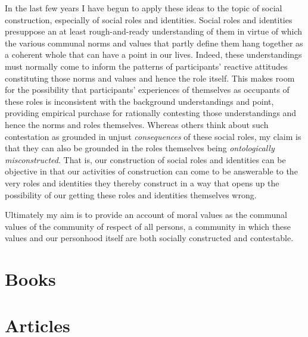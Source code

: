 \documentclass[%
  11pt,%
]{article}
\begin{document}
In the last few years I have begun to apply these ideas to the topic of social construction, especially of social roles and identities. Social roles and identities presuppose an at least rough-and-ready understanding of them in virtue of which the various communal norms and values that partly define them hang together as a coherent whole that can have a point in our lives. Indeed, these understandings must normally come to inform the patterns of participants' reactive attitudes constituting those norms and values and hence the role itself. This makes room for the possibility that participants' experiences of themselves as occupants of these roles is inconsistent with the background understandings and point, providing empirical purchase for rationally contesting those understandings and hence the norms and roles themselves. Whereas others think about such contestation as grounded in unjust \emph{consequences} of these social roles, my claim is that they can also be grounded in the roles themselves being \emph{ontologically misconstructed}. That is, our construction of social roles and identities can be objective in that our activities of construction can come to be answerable to the very roles and identities they thereby construct in a way that opens up the possibility of our getting these roles and identities themselves wrong.

\bigskip{}

Ultimately my aim is to provide an account of moral values as the communal values of the community of respect of all persons, a community in which these values and our personhood itself are both socially constructed and contestable.


\section{Books}

\nocite{Helm2017Communities-Respect-Persons,Helm2010Love-Friendship-Self,Helm2001Emotional-Reason-Deliberation}

\printbibliography

\section{Articles}
\end{document}
